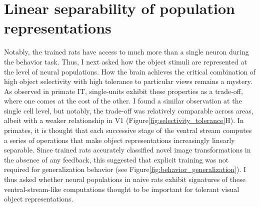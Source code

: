 \section{Linear separability of population representations}
Notably, the trained rats have access to much more than a single neuron during the behavior task. Thus, I next asked how the object stimuli are represented at the level of neural populations. How the brain achieves the critical combination of high object selectivity with high tolerance to particular views remains a mystery. As observed in primate IT, single-units exhibit these properties as a trade-off, where one comes at the cost of the other\cite{Zoccolan2007}. I found a similar observation at the single cell level, but notably, the trade-off was relatively comparable across areas, albeit with a weaker relationship in V1 (Figure\ref{fig:selectivity_tolerance}H). In primates, it is thought that each successive stage of the ventral stream computes a series of operations that make object representations increasingly linearly separable. Since trained rats accurately classified novel image transformations in the absence of any feedback, this suggested that explicit training was not required for generalization behavior (see Figure\ref{fig:behavior_generalization}). I thus asked whether neural populations in naive rats exhibit signatures of these ventral-stream-like computations thought to be important for tolerant visual object representations.

